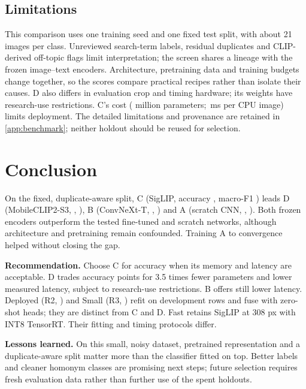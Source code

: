 \documentclass[11pt,a4paper]{article}
\begin{document}
\subsection{Limitations}\label{sec:limits}
This comparison uses one training seed and one fixed test split, with about 21 images per class.
Unreviewed search-term labels, residual duplicates and CLIP-derived off-topic flags limit interpretation;
the screen shares a lineage with the frozen image--text encoders. Architecture, pretraining data and training
budgets change together, so the scores compare practical recipes rather than isolate their causes.
D also differs in evaluation crop and timing hardware; its weights have research-use restrictions.
C's cost (\paramsMC{} million parameters; \cpuMsC\,ms per CPU image) limits deployment.
The detailed limitations and provenance are retained in \cref{app:benchmark}; neither holdout should be reused for selection.


\section{Conclusion}\label{sec:conclusion}
On the fixed, duplicate-aware split, C (SigLIP, accuracy \accC, macro-F1 \foneC) leads D
(MobileCLIP2-S3, \accD, \foneD), B (ConvNeXt-T, \accB, \foneB) and A (scratch CNN, \accA, \foneA).
Both frozen encoders outperform the tested fine-tuned and scratch networks, although architecture and pretraining
remain confounded. Training A to convergence helped without closing the gap.

\textbf{Recommendation.} Choose C for accuracy when its memory and latency are acceptable. D trades
\diffCD{} accuracy points for 3.5 times fewer parameters and lower measured latency, subject to research-use
restrictions. B offers still lower latency. Deployed (R2, \accRB) and Small (R3, \accRC) refit on development
rows and fuse with zero-shot heads; they are distinct from C and D. Fast retains SigLIP at 308 px with INT8
TensorRT. Their fitting and timing protocols differ.

\textbf{Lessons learned.} On this small, noisy dataset, pretrained representation and a duplicate-aware split
matter more than the classifier fitted on top. Better labels and cleaner homonym classes are promising next steps;
future selection requires fresh evaluation data rather than further use of the spent holdouts.

\FloatBarrier
\renewcommand{\bibfont}{\small}\setlength{\bibsep}{2pt plus 1pt}


\end{document}
